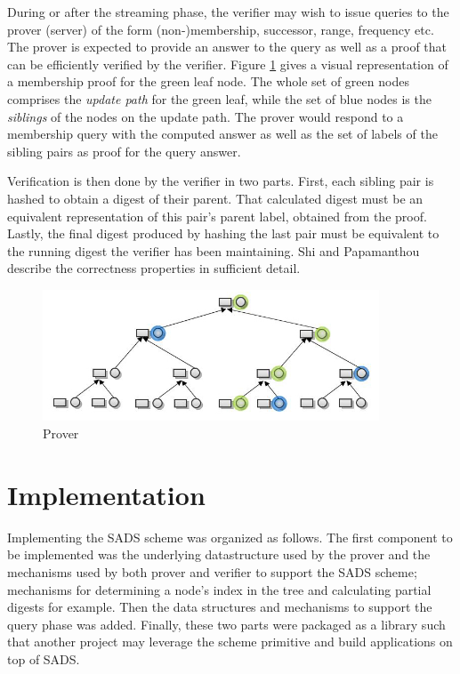 \documentclass[11pt, letterpaper, oneside]{article}
\begin{document}
		During or after the streaming phase, the verifier may wish to issue queries to the prover (server) of the form (non-)membership, successor, range, frequency etc. 
		The prover is expected to provide an answer to the query as well as a proof that can be efficiently verified by the verifier.
		Figure \ref{fig:proof} gives a visual representation of a membership proof for the green leaf node.
		The whole set of green nodes comprises the \textit{update path} for the green leaf, while
		the set of blue nodes is the \textit{siblings} of the nodes on the update path.
		The prover would respond to a membership query with the computed answer as well as the set of labels of the sibling pairs as proof for the query answer. 

		Verification is then done by the verifier in two parts.
		First, each sibling pair is hashed to obtain a digest of their parent.
		That calculated digest must be an equivalent representation of this pair's parent label, obtained from the proof.
		Lastly, the final digest produced by hashing the last pair must be equivalent to the running digest the verifier has been maintaining.
		Shi and Papamanthou \cite{dads} describe the correctness properties in sufficient detail.

		\begin{figure}[h]
		\centering
		\includegraphics[width=100mm]{./images/8.jpg}
		\caption[]{Prover}
		\label{fig:proof}
		\end{figure}


\section{ Implementation }
\label{sec:impl}

	Implementing the SADS scheme was organized as follows.
	The first component to be implemented was the underlying datastructure used by the prover and the mechanisms used by both prover and verifier to support the SADS scheme; mechanisms for determining a node's index in the tree and calculating partial digests for example.
	Then the data structures and mechanisms to support the query phase was added.
	Finally, these two parts were packaged as a library such that another project may leverage the scheme primitive and build applications on top of SADS.
\end{document}
